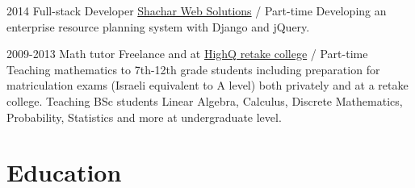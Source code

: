 \documentclass[]{friggeri-cv}
\begin{document}
\begin{entrylist}
  \entry
  {2014}
  {Full-stack Developer}
  {\href{http://www.shachar-web.co.il/eng/}{Shachar Web Solutions} / Part-time}
  {
    Developing an enterprise resource planning system with Django and jQuery.
  }

  \entry
  {2009-2013}
  {Math tutor}
  {Freelance and at \href{https://www.high-q.co.il/}{HighQ retake college} / Part-time}
  {
    Teaching mathematics to 7th-12th grade students including preparation for matriculation exams (Israeli equivalent to A level) both privately and at a retake college.
    Teaching BSc students Linear Algebra, Calculus, Discrete Mathematics, Probability, Statistics and more at undergraduate level.
  }

\end{entrylist}

\clearpage


\section{Education}
\end{document}
